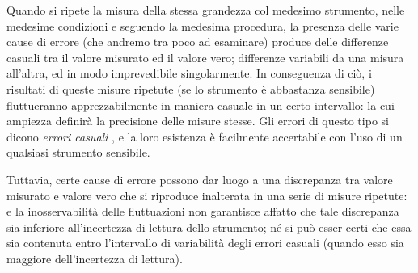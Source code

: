 Quando si ripete la misura della stessa grandezza col
medesimo strumento, nelle medesime condizioni e seguendo la
medesima procedura, la presenza delle varie cause di errore
(che andremo tra poco ad esaminare) produce delle differenze
casuali tra il valore misurato ed il valore vero; differenze
variabili da una misura all'altra, ed in modo imprevedibile
singolarmente.  In conseguenza di ci\`o, i risultati di
queste misure ripetute (se lo strumento \`e abbastanza
sensibile) fluttueranno apprezzabilmente in maniera casuale
in un certo intervallo: la cui ampiezza definir\`a la
precisione delle misure stesse.  Gli errori di questo tipo
si dicono \emph{errori casuali}%
,
e la loro esistenza \`e facilmente accertabile con l'uso di
un qualsiasi strumento sensibile.

Tuttavia, certe cause di errore possono dar luogo a una
discrepanza tra valore misurato e valore vero che si
riproduce inalterata in una serie di misure ripetute: e la
inosservabilit\`a delle fluttuazioni non garantisce affatto
che tale discrepanza sia inferiore all'incertezza di lettura
dello strumento; n\'e si pu\`o esser certi che essa sia
contenuta entro l'intervallo di variabilit\`a degli errori
casuali (quando esso sia maggiore dell'incertezza di
lettura).

